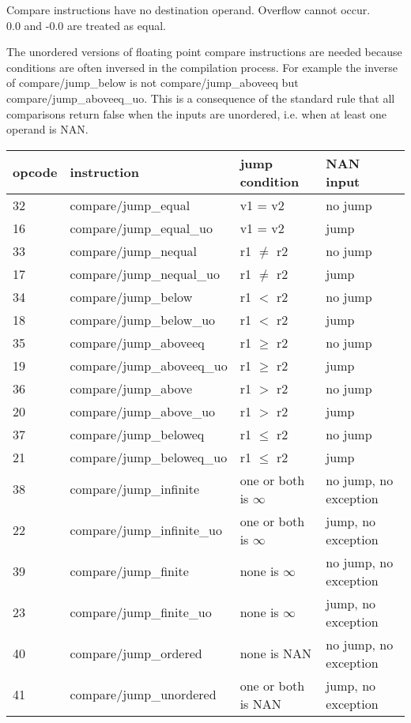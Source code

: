 \documentclass[forwardcom.tex]{subfiles}
\begin{document}
Compare instructions have no destination operand. 
Overflow cannot occur. \\
0.0 and -0.0 are treated as equal.
\vspace{2mm}

The unordered versions of floating point compare instructions are needed because conditions are often inversed in the compilation process. For example the inverse of compare/jump\_below is not compare/jump\_aboveeq but compare/jump\_aboveeq\_uo. This is a consequence of the standard rule that all comparisons return false when the inputs are unordered, i.e. when at least one operand is NAN.
\vspace{4mm}

\label{table:floatCompareJumpInstructions}
\begin{tabular}{|p{12mm}|p{60mm}|p{50mm}|p{25mm}|}
\hline
\bfseries opcode & \bfseries instruction & \bfseries jump condition & \bfseries NAN input \\ \hline
32 & compare/jump\_equal & v1 = v2 & no jump \\ \hline
16 & compare/jump\_equal\_uo & v1 = v2 & jump \\ \hline
33 & compare/jump\_nequal  & r1 $\neq$ r2 & no jump \\ \hline
17 & compare/jump\_nequal\_uo  & r1 $\neq$ r2 & jump \\ \hline
34 & compare/jump\_below & r1 $<$ r2 & no jump  \\ \hline
18 & compare/jump\_below\_uo & r1 $<$ r2 & jump  \\ \hline
35 & compare/jump\_aboveeq & r1 $\geq$ r2 & no jump  \\ \hline
19 & compare/jump\_aboveeq\_uo & r1 $\geq$ r2 & jump  \\ \hline
36 & compare/jump\_above & r1 $>$ r2 & no jump   \\ \hline
20 & compare/jump\_above\_uo & r1 $>$ r2 & jump   \\ \hline
37 & compare/jump\_beloweq  & r1 $\leq$ r2 & no jump  \\ \hline
21 & compare/jump\_beloweq\_uo  & r1 $\leq$ r2 & jump  \\ \hline
38 & compare/jump\_infinite & one or both is $\infty$ &  no jump, \newline no exception \\ \hline
22 & compare/jump\_infinite\_uo & one or both is $\infty$ & jump, \newline no exception  \\ \hline
39 & compare/jump\_finite & none is $\infty$ &  no jump, \newline no exception \\ \hline
23 & compare/jump\_finite\_uo & none is $\infty$ & jump, \newline no exception \\ \hline
40 & compare/jump\_ordered & none is NAN & no jump, \newline no exception \\ \hline
41 & compare/jump\_unordered & one or both is NAN & jump, \newline no exception \\ \hline
\end{tabular}
\vspace{2mm}
\end{document}
